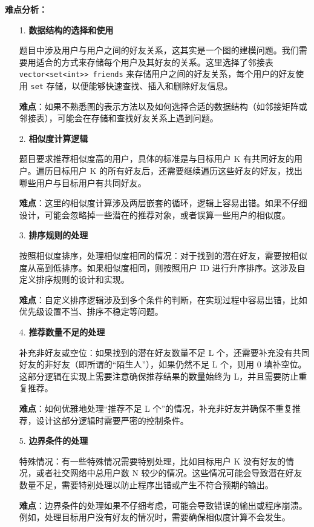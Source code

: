 \documentclass[a4paper]{ctexart}
\begin{document}
\noindent\textbf{难点分析：}
\begin{itemize}
	\item [1.] \textbf{数据结构的选择和使用} 
	
	题目中涉及用户与用户之间的好友关系，这其实是一个图的建模问题。我们需要用适合的方式来存储每个用户及其好友的关系。这里选择了邻接表 \texttt{vector<set<int>> friends} 来存储用户之间的好友关系，每个用户的好友使用 \texttt{set} 存储，以便能够快速查找、插入和删除好友信息。
	
	\textbf{难点}：如果不熟悉图的表示方法以及如何选择合适的数据结构（如邻接矩阵或邻接表），可能会在存储和查找好友关系上遇到问题。
	
	\item [2.] \textbf{相似度计算逻辑}
	
	题目要求推荐相似度高的用户，具体的标准是与目标用户 K 有共同好友的用户。遍历目标用户 K 的所有好友后，还需要继续遍历这些好友的好友，找出哪些用户与目标用户有共同好友。
	
	\textbf{难点}：这里的相似度计算涉及两层嵌套的循环，逻辑上容易出错。如果不仔细设计，可能会忽略掉一些潜在的推荐对象，或者误算一些用户的相似度。
	
	\item [3.] \textbf{排序规则的处理}
	
	按照相似度排序，处理相似度相同的情况：对于找到的潜在好友，需要按相似度从高到低排序。如果相似度相同，则按照用户 ID 进行升序排序。这涉及自定义排序规则的设计和实现。
	
	\textbf{难点}：自定义排序逻辑涉及到多个条件的判断，在实现过程中容易出错，比如优先级设置不当、排序不稳定等问题。
	
	\item [4.] \textbf{推荐数量不足的处理}
	
	补充非好友或空位：如果找到的潜在好友数量不足 L 个，还需要补充没有共同好友的非好友（即所谓的“陌生人”），如果仍然不足 L 个，则用 0 填补空位。这部分逻辑在实现上需要注意确保推荐结果的数量始终为 L，并且需要防止重复推荐。
	
	\textbf{难点}：如何优雅地处理“推荐不足 L 个”的情况，补充非好友并确保不重复推荐，设计这部分逻辑时需要严密的控制条件。
	
	\item [5.] \textbf{边界条件的处理}
	
	特殊情况：有一些特殊情况需要特别处理，比如目标用户 K 没有好友的情况，或者社交网络中总用户数 N 较少的情况。这些情况可能会导致潜在好友数量不足，需要特别处理以防止程序出错或产生不符合预期的输出。
	
	\textbf{难点}：边界条件的处理如果不仔细考虑，可能会导致错误的输出或程序崩溃。例如，处理目标用户没有好友的情况时，需要确保相似度计算不会发生。
	
\end{itemize}
\end{document}
